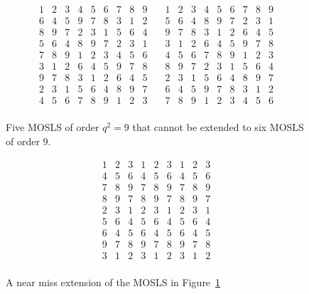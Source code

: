 \documentclass{article}
\begin{document}
\begin{figure}
\begin{center}
  \[\begin{array}{ccc|ccc|ccc}
1 & 2 & 3 & 4 & 5 & 6 & 7 & 8 & 9 \\
6 & 4 & 5 & 9 & 7 & 8 & 3 & 1 & 2 \\
8 & 9 & 7 & 2 & 3 & 1 & 5 & 6 & 4 \\
\hline
5 & 6 & 4 & 8 & 9 & 7 & 2 & 3 & 1 \\
7 & 8 & 9 & 1 & 2 & 3 & 4 & 5 & 6 \\
3 & 1 & 2 & 6 & 4 & 5 & 9 & 7 & 8 \\
\hline
9 & 7 & 8 & 3 & 1 & 2 & 6 & 4 & 5 \\
2 & 3 & 1 & 5 & 6 & 4 & 8 & 9 & 7 \\
4 & 5 & 6 & 7 & 8 & 9 & 1 & 2 & 3 \\
\end{array}\quad\begin{array}{ccc|ccc|ccc}
1 & 2 & 3 & 4 & 5 & 6 & 7 & 8 & 9 \\
5 & 6 & 4 & 8 & 9 & 7 & 2 & 3 & 1 \\
9 & 7 & 8 & 3 & 1 & 2 & 6 & 4 & 5 \\
\hline
3 & 1 & 2 & 6 & 4 & 5 & 9 & 7 & 8 \\
4 & 5 & 6 & 7 & 8 & 9 & 1 & 2 & 3 \\
8 & 9 & 7 & 2 & 3 & 1 & 5 & 6 & 4 \\
\hline
2 & 3 & 1 & 5 & 6 & 4 & 8 & 9 & 7 \\
6 & 4 & 5 & 9 & 7 & 8 & 3 & 1 & 2 \\
7 & 8 & 9 & 1 & 2 & 3 & 4 & 5 & 6 \\
\end{array}\]
\end{center}
\caption{\label{fig:soduku}Five MOSLS of order \(q^{2} = 9\) that cannot be extended to six MOSLS of order \(9\).}
\end{figure}


\begin{figure}
  \begin{center}
    \[
  \begin{array}{ccc|ccc|ccc}

1 & 2 & 3 & 1 & 2 & 3 & 1 & 2 & 3 \\
4 & 5 & 6 & 4 & 5 & 6 & 4 & 5 & 6 \\
    7 & 8 & 9 & 7 & 8 & 9 & 7 & 8 & 9 \\
    \hline
8 & 9 & 7 & 8 & 9 & 7 & 8 & 9 & 7 \\
2 & 3 & 1 & 2 & 3 & 1 & 2 & 3 & 1 \\
    5 & 6 & 4 & 5 & 6 & 4 & 5 & 6 & 4 \\
    \hline
6 & 4 & 5 & 6 & 4 & 5 & 6 & 4 & 5 \\
9 & 7 & 8 & 9 & 7 & 8 & 9 & 7 & 8 \\
3 & 1 & 2 & 3 & 1 & 2 & 3 & 1 & 2 \\
  \end{array}\]
\caption{\label{fig:almost-soduku}A near miss extension of the MOSLS in Figure~\ref{fig:soduku}}
\end{center}
\end{figure}
\end{document}
